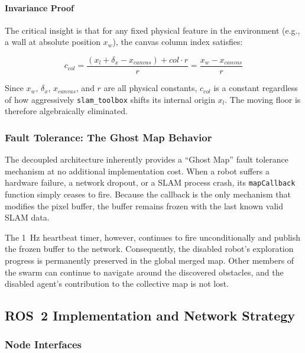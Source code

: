 \documentclass{article}
\begin{document}
\paragraph{Invariance Proof}
The critical insight is that for any fixed physical feature in the environment (e.g., a wall at absolute position $x_w$), the canvas column index satisfies:

\begin{equation}
    c_{col} = \frac{(x_l + \delta_x - x_{canvas}) + col \cdot r}{r} = \frac{x_w - x_{canvas}}{r}
    \label{eq:invariance}
\end{equation}

Since $x_w$, $\delta_x$, $x_{canvas}$, and $r$ are all physical constants, $c_{col}$ is a constant regardless of how aggressively \texttt{slam\_toolbox} shifts its internal origin $x_l$. The moving floor is therefore algebraically eliminated.

\subsubsection{Fault Tolerance: The Ghost Map Behavior}
\label{subsubsec:ghost_map}

The decoupled architecture inherently provides a ``Ghost Map'' fault tolerance mechanism at no additional implementation cost. When a robot suffers a hardware failure, a network dropout, or a SLAM process crash, its \texttt{mapCallback} function simply ceases to fire. Because the callback is the only mechanism that modifies the pixel buffer, the buffer remains frozen with the last known valid SLAM data.

The 1~Hz heartbeat timer, however, continues to fire unconditionally and publish the frozen buffer to the network. Consequently, the disabled robot's exploration progress is permanently preserved in the global merged map. Other members of the swarm can continue to navigate around the discovered obstacles, and the disabled agent's contribution to the collective map is not lost.

\subsection{ROS~2 Implementation and Network Strategy}
\label{subsec:map_merge_ros2}

\subsubsection{Node Interfaces}
\end{document}
